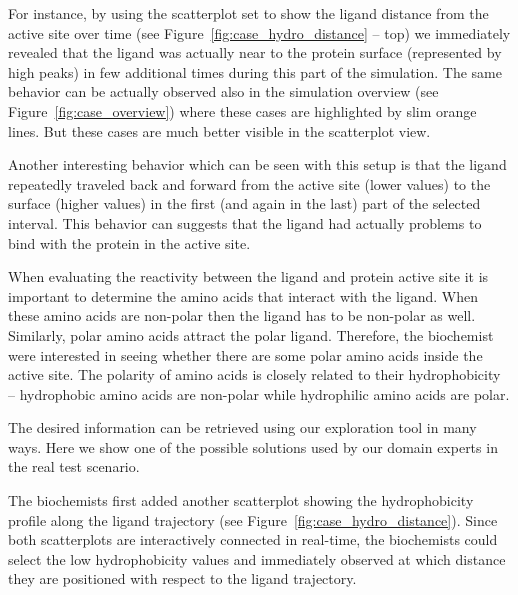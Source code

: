 \documentclass[twocolumn]{bmcart}%
\begin{document}
For instance, by using the scatterplot set to show the ligand distance from the active site over time (see Figure~\ref{fig:case_hydro_distance} -- top) we immediately revealed that the ligand was actually near to the protein surface (represented by high peaks) in few additional times during this part of the simulation.
The same behavior can be actually observed also in the simulation overview (see Figure~\ref{fig:case_overview}) where these cases are highlighted by slim orange lines. 
But these cases are much better visible in the scatterplot view.

Another interesting behavior which can be seen with this setup is that the ligand repeatedly traveled back and forward from the active site (lower values) to the surface (higher values) in the first (and again in the last) part of the selected interval.
This behavior can suggests that the ligand had actually problems to bind with the protein in the active site.

 
 


When evaluating the reactivity between the ligand and protein active site it is important to determine the amino acids that interact with the ligand. 
When these amino acids are non-polar then the ligand has to be non-polar as well.
Similarly, polar amino acids attract the polar ligand.
Therefore, the biochemist were interested in seeing whether there are some polar amino acids inside the active site.
The polarity of amino acids is closely related to their hydrophobicity -- hydrophobic amino acids are non-polar while hydrophilic amino acids are polar. 

The desired information can be retrieved using our exploration tool in many ways.
Here we show one of the possible solutions used by our domain experts in the real test scenario.

The biochemists first added another scatterplot showing the hydrophobicity profile along the ligand trajectory (see Figure~\ref{fig:case_hydro_distance}).
Since both scatterplots are interactively connected in real-time, the biochemists could select the low hydrophobicity values and immediately observed at which distance they are positioned with respect to the ligand trajectory. 
\end{document}
